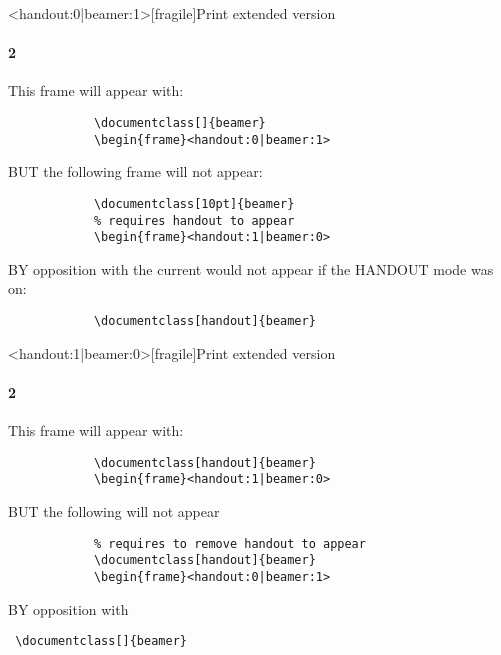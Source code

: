 	\begin{frame}<handout:0|beamer:1>[fragile]{Print extended version}
		\framesubtitle{2}
		
		This frame will appear with:
		\vspace*{-2.5em}
		\begin{verbatim}			
			\documentclass[]{beamer}
			\begin{frame}<handout:0|beamer:1>
		\end{verbatim}
		
		BUT the following frame will not appear:
		\vspace*{-2.5em}
		\begin{verbatim}			
			\documentclass[10pt]{beamer} 
			% requires handout to appear
			\begin{frame}<handout:1|beamer:0>
		\end{verbatim}
		
		BY opposition with the current would not appear if the HANDOUT mode was on:
		\vspace*{-1em}
		\begin{verbatim} 
			\documentclass[handout]{beamer}
		\end{verbatim}
	\end{frame}
			
	\begin{frame}<handout:1|beamer:0>[fragile]{Print extended version}
	\framesubtitle{2}
		
		This frame will appear with:
		\begin{verbatim}			
			\documentclass[handout]{beamer}
			\begin{frame}<handout:1|beamer:0>
		\end{verbatim}
		
		BUT the following will not appear
		\begin{verbatim}			
			% requires to remove handout to appear
			\documentclass[handout]{beamer} 
			\begin{frame}<handout:0|beamer:1>
		\end{verbatim}
		
		BY opposition with \begin{verbatim} \documentclass[]{beamer}
		\end{verbatim}
	\end{frame}
	